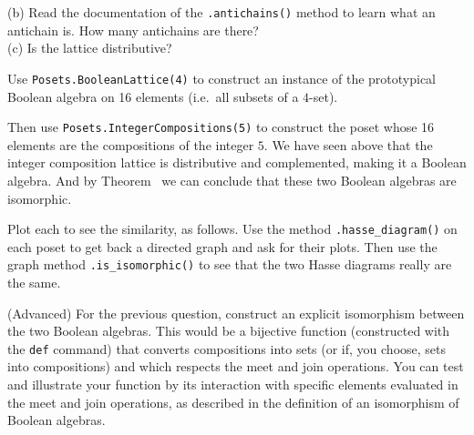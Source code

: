 %
(b) Read the documentation of the \verb?.antichains()? method to learn what an antichain is.  How many antichains are there?\\
%
(c) Is the lattice distributive?
\begin{sageverbatim}\end{sageverbatim}
%
%
Use \verb?Posets.BooleanLattice(4)? to construct an instance of the prototypical Boolean algebra on 16 elements (i.e.\ all subsets of a $4$-set).\par
%
Then use \verb?Posets.IntegerCompositions(5)? to construct the poset whose 16 elements are the compositions of the integer $5$.  We have seen above that the integer composition lattice is distributive and complemented, making it a Boolean algebra.  And by Theorem~ we can conclude that these two Boolean algebras are isomorphic.\par
%
Plot each to see the similarity, as follows.  Use the method \verb?.hasse_diagram()? on each poset to get back a directed graph and ask for their plots.  Then use the graph method \verb?.is_isomorphic()? to see that the two Hasse diagrams really are the same.
\begin{sageverbatim}\end{sageverbatim}
%
%
(Advanced) For the previous question, construct an explicit isomorphism between the two Boolean algebras.  This would be a bijective function (constructed with the \verb?def? command) that converts compositions into sets (or if, you choose, sets into compositions) and which respects the meet and join operations.  You can test and illustrate your function by its interaction with specific elements evaluated in the meet and join operations, as described in the definition of an isomorphism of Boolean algebras.
